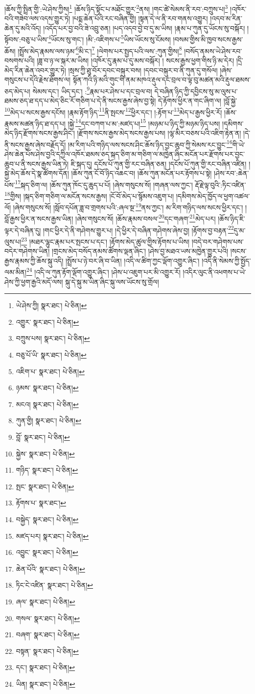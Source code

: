 །ཆོས་ཀྱི་སྤྲིན་གྱི་:ཡེ་ཤེས་ཀྱིས།\footnote{ཡེ་ཤེས་ཀྱི།  སྣར་ཐང་།  པེ་ཅིན། } །ཆོས་ཉིད་སྟོང་པ་མཐོང་གྱུར་\footnote{འགྱུར་  སྣར་ཐང་།  པེ་ཅིན། }ནས། །གང་ཚེ་སེམས་ནི་རབ་:བཀྲུས་པ།\footnote{བཀྲུས་པས།  སྣར་ཐང་།  པེ་ཅིན། } །འཁོར་བའི་གཟེབ་ལས་འདས་གྱུར་ཏེ། །པདྨ་ཆེན་པོའི་རང་བཞིན་གྱི། །སྟན་དེ་ལ་ནི་རབ་གནས་འགྱུར། །འདབ་མ་རིན་ཆེན་དུ་མའི་འོད། །འདོད་པར་བྱ་བའི་ཟེ་འབྲུ་ཅན། །པད་འདབ་བྱེ་བ་དུ་མ་ཡིས། །རྣམ་པ་ཀུན་དུ་ཡོངས་སུ་བསྐོར། །སྟོབས་:བཅུ་པ་ཡིས་\footnote{བཅུ་པོ་ཡི་  སྣར་ཐང་།  པེ་ཅིན། }ཡོངས་སུ་གང་། །མི་:འཇིགས་པ་\footnote{འཇིག་པ་  སྣར་ཐང་།  པེ་ཅིན། }ཡིས་ཡོངས་སུ་ངོམས། །བསམ་གྱིས་མི་ཁྱབ་སངས་རྒྱས་ཆོས། །སྤྲོས་མེད་རྣམས་ལས་ཉམ་\footnote{ཉམས་  སྣར་ཐང་།  པེ་ཅིན། }མི་ང་།\footnote{མངའ།  སྣར་ཐང་།  པེ་ཅིན། } །ལེགས་པར་སྤྱད་པའི་ལས་:ཀུན་གྱིས།\footnote{ཀུན་གྱི།  སྣར་ཐང་།  པེ་ཅིན། } །བསོད་ནམས་ཡེ་ཤེས་རབ་བསགས་པའི། །ཟླ་བ་ཉ་ལ་སྐར་མ་ཡིས། །འཁོར་དུ་རྣམ་པ་དུ་མས་བསྐོར། །
སངས་རྒྱས་ཕྱག་གིས་ཉི་མ་དེར། །དྲི་མེད་རིན་ཆེན་འབར་གྱུར་ཏེ། །སྲས་ཀྱི་ཐུ་བོར་དབང་བསྐུར་བས། །དབང་བསྐུར་བ་ནི་ཀུན་དུ་གསོལ། །ཞེས་གསུངས་པ་དེའི་རྗེས་ཐོགས་ལ། སྟོན་ཀའི་ཉི་མའི་གུང་གི་ནམ་མཁའ་རྡུལ་དང་བྲལ་བ་ལྟ་བུ་མཚན་མའི་རྡུལ་ཐམས་ཅད་མེད་པ། སེམས་དང་། ཡིད་དང་། :\footnote{བློ་  སྣར་ཐང་།  པེ་ཅིན། }རྣམ་པར་ཤེས་པ་དང་བྲལ་བ། དེ་བཞིན་ཉིད་ཀྱི་དབྱིངས་སུ་མ་ལུས་པ་ཐམས་ཅད་ཐ་དད་པ་མེད་ཅིང་རོ་གཅིག་པ་དེ་ནི་སངས་རྒྱས་ཞེས་བྱ་སྟེ། དེ་རྟོགས་ཕྱིར་ན་གང་ཞིག་ལ། །བློ་སྐྱེ་\footnote{སྐྱེས་  སྣར་ཐང་།  པེ་ཅིན། }མེད་པ་སངས་རྒྱས་དངོས། །རྣམ་རྟོག་ཉིད་\footnote{གཉིད་  སྣར་ཐང་།  པེ་ཅིན། }ནི་སྤངས་\footnote{སྤང་  སྣར་ཐང་།  པེ་ཅིན། }ཕྱིར་དང་། །:རྟོག་པ་\footnote{རྟོགས་པ་  སྣར་ཐང་། }མེད་པ་རྒྱས་ཕྱིར་རོ། །ཆོས་རྣམས་མཚན་ཉིད་ཐ་དད་པ། །སྐྱེ་\footnote{བསྐྱེད་  སྣར་ཐང་།  པེ་ཅིན། }དང་བཀག་པ་མ་:མཛད་པ།\footnote{མཛད་པར།  སྣར་ཐང་།  པེ་ཅིན། } །མཉམ་པ་ཉིད་ཀྱི་མཉམ་ཉིད་པས། །དམིགས་མེད་ཉིད་རྫོགས་སངས་རྒྱས་ཤིང་། །རྫོགས་སངས་རྒྱས་མེད་སངས་རྒྱས་པས། །ལྷ་མིར་བཅས་པའི་འཇིག་རྟེན་ན། །དེ་ནི་སངས་རྒྱས་ཞེས་བརྗོད་དོ། །མ་རིག་པའི་གཉིད་ལས་སངས་ཤིང་ཆོས་ཉིད་བྱང་ཆུབ་ཀྱི་སེམས་རང་བྱུང་\footnote{འབྱུང་  སྣར་ཐང་།  པེ་ཅིན། }གི་ཡེ་ཤེས་ཆེན་པོས་ཤེས་བྱའི་དཀྱིལ་འཁོར་ཐམས་ཅད་སྐད་ཅིག་མ་གཅིག་ལ་མཁྱེན་ཞིང་མངོན་པར་རྫོགས་པར་བྱང་ཆུབ་པ་ནི་སངས་རྒྱས་ཡིན་ཏེ། ཇི་སྐད་དུ། དངོས་པོ་ཀུན་གྱི་རང་བཞིན་ཅན། །དངོས་པོ་ཀུན་གྱི་རང་བཞིན་འཛིན། །སྐྱེ་མེད་ཆོས་དེ་སྣ་ཚོགས་དོན། །ཆོས་ཀུན་ངོ་བོ་ཉིད་འཆང་བ། །ཆོས་ཀུན་མངོན་པར་རྟོགས་པ་སྟེ། །ཤེས་རབ་:ཆེན་པོས་\footnote{ཆེན་པོའི་  སྣར་ཐང་།  པེ་ཅིན། }སྐད་ཅིག་ལ། །ཆོས་ཀུན་ཁོང་དུ་ཆུད་པ་པོ། །ཞེས་གསུངས་སོ། །གཞན་ལས་ཀྱང་། རྡོ་རྗེ་ལྟ་བུའི་:ཏིང་འཛིན་\footnote{ཏིང་ངེ་འཛིན་  སྣར་ཐང་།  པེ་ཅིན། }གྱིས། །སྐད་ཅིག་གཅིག་ལ་མངོན་སངས་རྒྱས། །ངོ་བོ་མེད་པ་སྙོམས་འཇུག་པ། །དམིགས་མེད་ཁྱོད་ལ་ཕྱག་འཚལ་ལོ། །ཞེས་གསུངས་སོ། །སློབ་དཔོན་ཟླ་བ་གྲགས་པའི་:ཞལ་སྔ་\footnote{ཞལ་  སྣར་ཐང་།  པེ་ཅིན། }ནས་ཀྱང་། མ་རིག་གཉིད་ལས་སངས་ཕྱིར་དང་། །བློ་རྒྱས་ཕྱིར་ན་སངས་རྒྱས་ཡིན། །ཞེས་གསུངས་སོ། །ཆོས་རྣམས་བསལ་\footnote{གསལ་  སྣར་ཐང་།  པེ་ཅིན། }དང་གཞག་\footnote{བཞག་  སྣར་ཐང་།  པེ་ཅིན། }མེད་པར། །ཆོས་ཉིད་ཇི་ལྟར་དེ་བཞིན་དུ། །གང་ཕྱིར་དེ་ནི་གཤེགས་གྱུར་པ། །དེ་ཕྱིར་དེ་བཞིན་གཤེགས་ཞེས་བྱ། །རྟོགས་བྱ་བརྟན་\footnote{བསྟན་  སྣར་ཐང་།  པེ་ཅིན། }དུ་མ་ལུས་པ།\footnote{དང་།  སྣར་ཐང་།  པེ་ཅིན། } །མཐར་ལྷུང་རྣམ་པར་སྤངས་པ་དང་། །རྟོགས་མེད་ཚུལ་གྱིས་རྟོགས་པ་ཡིས། །བདེ་བར་གཤེགས་པས་བདེར་གཤེགས་ཡིན། །གྲངས་མེད་བསོད་ནམས་ཚོགས་ལྡན་ཞིང་། །ཤེས་བྱ་མཐའ་ཡས་མཁྱེན་གྱུར་པའི། །སངས་རྒྱས་རྣམས་ཀྱི་ཆོས་སྐུ་འདི། །སྤྲོས་པ་ཉེ་བར་ཞི་བ་ཡིན། །འདི་ལ་ཚིག་ཀྱང་ལྡོག་འགྱུར་ཞིང་། །འདི་ནི་སེམས་ཀྱི་སྤྱོད་ལམ་མིན།\footnote{ཡིན།  སྣར་ཐང་།  པེ་ཅིན། } །འདི་ལ་ཀུན་རྟོག་ལྡོག་འགྱུར་ཞིང་། །ཤེས་པ་འཇུག་པར་མི་འགྱུར་རོ། །འདིར་ལུང་ནི་འཕགས་པ་ཡེ་ཤེས་ཀྱི་ཕྱག་རྒྱའི་མདོ་ལས། སྐུ་དེ་སྐུ་མ་ཡིན་ཞིང་སྐུ་ལས་ཡོངས་སུ་གྲོལ། 